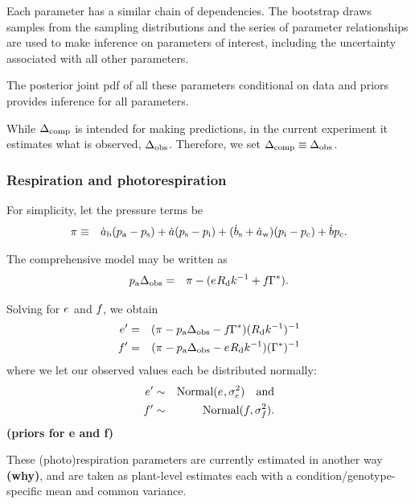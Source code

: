 Each parameter has a similar chain of dependencies.
The bootstrap draws samples from the sampling distributions
  and the series of parameter relationships are used to make inference
  on parameters of interest, including the uncertainty associated with all other parameters.


The posterior joint pdf of all these parameters
  conditional on data and priors
  provides inference for all parameters.

While $\Delta_{\textrm{comp}}$ is intended for making predictions,
  in the current experiment it estimates what is observed,
  $\Delta_{\textrm{obs}}$.
Therefore, we set $\Delta_{\textrm{comp}}\equiv\Delta_{\textrm{obs}}$.

\subsubsection{Respiration and photorespiration}

For simplicity, let the pressure terms be
\begin{eqnarray}
  \pi_{}
    & \equiv &
  \dot{a}_{\textrm{b}}(p_{\textrm{a}}-p_{\textrm{s}})+\dot{a}(p_{\textrm{s}}-p_{\textrm{i}})+(\dot{b}_{\textrm{s}}+\dot{a}_{\textrm{w}})(p_{\textrm{i}}-p_{\textrm{c}}) + \dot{b}p_{\textrm{c}}.
\nonumber
\end{eqnarray}

The comprehensive model may be written as
\begin{eqnarray}
  p_{\textrm{a}}\Delta_{\textrm{obs}}
    & = &
  \pi_{} - ( e_{}R_{\textrm{d}}k_{}^{-1} + f_{}\Gamma^{\ast}_{} ).
\nonumber
\end{eqnarray}

Solving for $e_{}$ and $f_{}$, we obtain
\begin{eqnarray}
  \sseprime
    & = &
  (\sallpressures - \spa\sDeltaobs - \ssf\sGammastar )(\sRd\ssk^{-1})^{-1}
\nonumber\\ %
  \ssfprime
    & = &
  (\sallpressures - \spa\sDeltaobs - \sse\sRd\ssk^{-1} )(\sGammastar)^{-1}
\nonumber
\end{eqnarray}
where we let our observed values each be distributed normally:
\begin{eqnarray}
  \sseprime
    & \sim &
  \Normal(\sse,\sdatasig{\sse}) \quad\textrm{and}
\nonumber\\ %
  \ssfprime
    & \sim &
  \Normal(\ssf,\sdatasig{\ssf}).
\nonumber
\end{eqnarray}
{\bf (priors for e and f)}

These (photo)respiration parameters are currently estimated in another way {\bf (why)},
and are taken as plant-level estimates each with a condition/genotype-specific mean
  and common variance.

